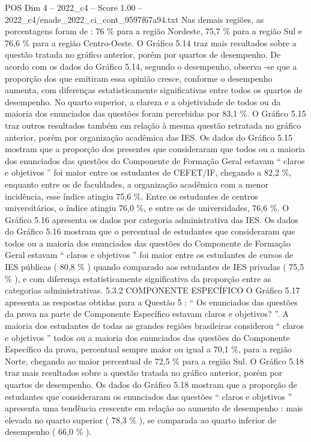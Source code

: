 \begin{textsample}{POS Dim 4 – 2022\_c4 – Score 1.00 – 2022\_c4/enade\_2022\_ci\_cont\_9597f67a94.txt}
Nas demais regiões, as porcentagens foram de : 76 \% para a região Nordeste, 75,7 \% para a região Sul e 76,6 \% para a região Centro-Oeste.
O Gráfico 5.14 traz mais resultados sobre a questão tratada no gráfico anterior, porém por quartos de desempenho.
De acordo com os dados do Gráfico 5.14, segundo o desempenho, observa -se que a proporção dos que emitiram essa opinião cresce, conforme o desempenho aumenta, com diferenças estatisticamente significativas entre todos os quartos de desempenho.
No quarto superior, a clareza e a objetividade de todos ou da maioria dos enunciados das questões foram percebidas por 83,1 \%.
O Gráfico 5.15 traz outros resultados também em relação à mesma questão retratada no gráfico anterior, porém por organização acadêmica das IES.
Os dados do Gráfico 5.15 mostram que a proporção dos presentes que consideraram que todos ou a maioria dos enunciados das questões do Componente de Formação Geral estavam “ claros e objetivos ” foi maior entre os estudantes de CEFET/IF, chegando a 82,2 \%, enquanto entre os de faculdades, a organização acadêmica com a menor incidência, esse índice atingiu 75,6 \%.
Entre os estudantes de centros universitários, o índice atingiu 76,0 \%, e entre os de universidades, 76,6 \%.
O Gráfico 5.16 apresenta os dados por categoria administrativa das IES.
Os dados do Gráfico 5.16 mostram que o percentual de estudantes que consideraram que todos ou a maioria dos enunciados das questões do Componente de Formação Geral estavam “ claros e objetivos ” foi maior entre os estudantes de cursos de IES públicas ( 80,8 \% ) quando comparado aos estudantes de IES privadas ( 75,5 \% ), e com diferença estatisticamente significativa da proporção entre as categorias administrativas. 5.3.2 COMPONENTE ESPECÍFICO O Gráfico 5.17 apresenta as respostas obtidas para a Questão 5 : “ Os enunciados das questões da prova na parte de Componente Específico estavam claros e objetivos? ”.
A maioria dos estudantes de todas as grandes regiões brasileiras considerou “ claros e objetivos ” todos ou a maioria dos enunciados das questões do Componente Específico da prova, percentual sempre maior ou igual a 70,1 \%, para a região Norte, chegando ao maior percentual de 72,5 \% para a região Sul.
O Gráfico 5.18 traz mais resultados sobre a questão tratada no gráfico anterior, porém por quartos de desempenho.
Os dados do Gráfico 5.18 mostram que a proporção de estudantes que consideraram os enunciados das questões “ claros e objetivos ” apresenta uma tendência crescente em relação ao aumento de desempenho : mais elevada no quarto superior ( 78,3 \% ), se comparada ao quarto inferior de desempenho ( 66,0 \% ).

\end{textsample}
